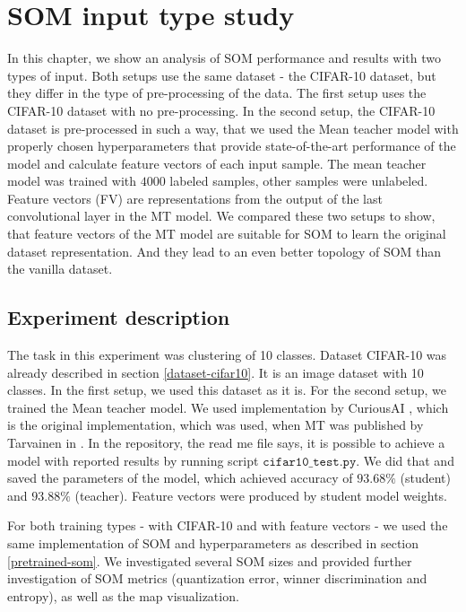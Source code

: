 \chapter{SOM input type study}

\label{chap:som-fv-cifar}

In this chapter, we show an analysis of SOM performance and results with two types of input. Both setups use the same dataset - the CIFAR-10 dataset, but they differ in the type of pre-processing of the data. The first setup uses the CIFAR-10 dataset with no pre-processing. In the second setup, the CIFAR-10 dataset is pre-processed in such a way, that we used the Mean teacher model with properly chosen hyperparameters that provide state-of-the-art performance of the model and calculate feature vectors of each input sample. The mean teacher model was trained with $4000$ labeled samples, other samples were unlabeled. Feature vectors (FV) are representations from the output of the last convolutional layer in the MT model. We compared these two setups to show, that feature vectors of the MT model are suitable for SOM to learn the original dataset representation. And they lead to an even better topology of SOM than the vanilla dataset.

\section{Experiment description}
The task in this experiment was clustering of 10 classes. Dataset CIFAR-10 was already described in section \ref{dataset-cifar10}. It is an image dataset with 10 classes. 
In the first setup, we used this dataset as it is. For the second setup, we trained the Mean teacher model. We used implementation by CuriousAI \cite{curiousai}, which is the original implementation, which was used, when MT was published by Tarvainen in \cite{tarvainen}. In the repository, the read me file says, it is possible to achieve a model with reported results by running script $\texttt{cifar10\_test.py}$. We did that and saved the parameters of the model, which achieved accuracy of $93.68\%$ (student) and $93.88\%$ (teacher). Feature vectors were produced by student model weights. 

For both training types - with CIFAR-10 and with feature vectors - we used the same implementation of SOM and hyperparameters as described in section \ref{pretrained-som}. We investigated several SOM sizes and provided further investigation of SOM metrics (quantization error, winner discrimination and entropy), as well as the map visualization.


